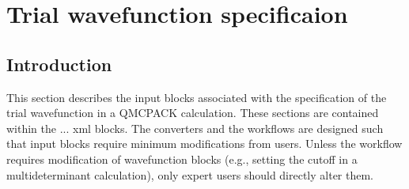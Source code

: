 \documentclass[letterpaper,10pt,english]{sphinxmanual}
\begin{document}
\begin{sphinxVerbatim}[commandchars=\\\{\}]
      
         
          
\end{sphinxVerbatim}




\chapter{Trial wavefunction specificaion}
\label{\detokenize{intro_wavefunction:trial-wavefunction-specificaion}}\label{\detokenize{intro_wavefunction:intro-wavefunction}}\label{\detokenize{intro_wavefunction::doc}}

\section{Introduction}
\label{\detokenize{intro_wavefunction:introduction}}\label{\detokenize{intro_wavefunction:trial-intro}}
This section describes the input blocks associated with the specification of the trial wavefunction in a QMCPACK calculation. These sections are contained within the  \(...\)   xml blocks.  The converters and the workflows are designed such that input blocks require minimum modifications from users. Unless the workflow requires modification of wavefunction blocks (e.g., setting the cutoff in a multideterminant calculation), only expert users should directly alter them.
\end{document}
